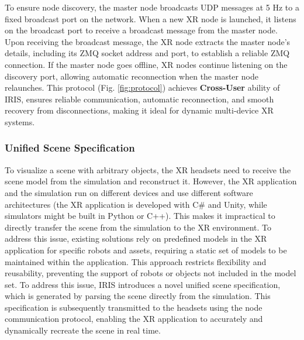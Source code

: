 

To ensure node discovery, the master node broadcasts UDP messages at 5 Hz to a fixed broadcast port on the network.
When a new XR node is launched, 
it listens on the broadcast port to receive a broadcast message from the master node. 
Upon receiving the broadcast message, the XR node extracts the master node's details, including its ZMQ socket address and port, to establish a reliable ZMQ connection.
If the master node goes offline, XR nodes continue listening on the discovery port, allowing automatic reconnection when the master node relaunches.
This protocol (Fig. \ref{fig:protocol}) achieves \textbf{Cross-User} ability of IRIS, ensures reliable communication, automatic reconnection, and smooth recovery from disconnections,
making it ideal for dynamic multi-device XR systems.


\subsubsection{Unified Scene Specification}

To visualize a scene with arbitrary objects, the XR headsets need to receive the scene model from the simulation and reconstruct it.
However, the XR application and the simulation run on different devices and use different software architectures (the XR application is developed with C\# and Unity, while simulators might be built in Python or C++).
This makes it impractical to directly transfer the scene from the simulation to the XR environment.
To address this issue, existing solutions rely on predefined models in the XR application for specific robots and assets, requiring a static set of models to be maintained within the application.
This approach restricts flexibility and reusability, preventing the support of robots or objects not included in the model set.
To address this issue, IRIS introduces a novel unified scene specification, which is generated by parsing the scene directly from the simulation.
This specification is subsequently transmitted to the headsets using the node communication protocol, enabling the XR application to accurately and dynamically recreate the scene in real time.

